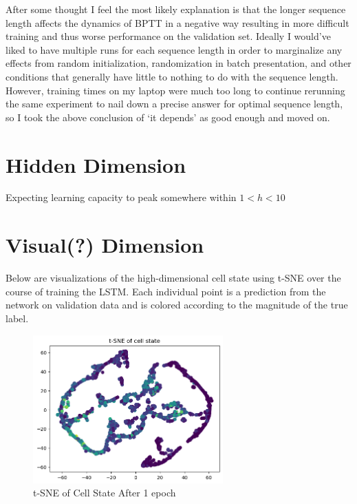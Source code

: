 \documentclass[12pt, twoside]{report}
\begin{document}
After some thought I feel the most likely explanation is that the longer sequence length affects the dynamics
of BPTT in a negative way resulting in more difficult training and thus worse performance on the validation set.
Ideally I would've liked to have multiple runs for each sequence length in order to marginalize any
effects from random initialization, randomization in batch presentation, and other conditions that generally
have little to nothing to do with the sequence length. However, training times on my laptop were much too long
to continue rerunning the same experiment to nail down a precise answer for optimal sequence length, so I took
the above conclusion of `it depends' as good enough and moved on.

\section{Hidden Dimension}

Expecting learning capacity to peak somewhere within $1 < h < 10$

\section{Visual(?) Dimension}

Below are visualizations of the high-dimensional cell state using t-SNE over the course of training the LSTM.
Each individual point is a prediction from the network on validation data and is colored according to the 
magnitude of the true label.

\begin{figure}[H]
    \centering
    \includegraphics[width=0.65\textwidth]{figures/cell state evolution/1 epoch.png}
    \caption*{t-SNE of Cell State After 1 epoch}
\end{figure}
\end{document}
